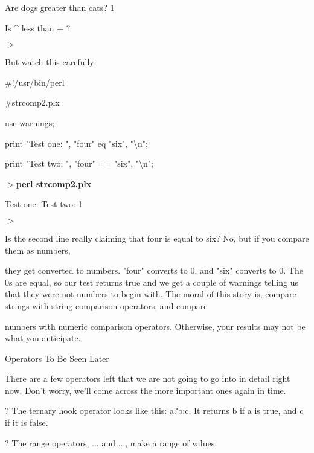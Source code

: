 \documentclass[a4paper,11pt]{book}
\begin{document}
\noindent Are dogs greater than cats? 1

\noindent Is \^{} less than + ?

\noindent $>$

\noindent 

\noindent But watch this carefully:

\noindent 

\noindent 

\noindent \#!/usr/bin/perl

\noindent \#strcomp2.plx

\noindent use warnings;

\noindent print "Test one: ", "four" eq "six", "\textbackslash n";

\noindent print "Test two: ", "four" == "six", "\textbackslash n";

\noindent 

\noindent $>$\textbf{perl strcomp2.plx}

\noindent Test one: Test two: 1

\noindent $>$

\noindent 

\noindent 

\noindent Is the second line really claiming that four is equal to six? No, but if you compare them as numbers,

\noindent they get converted to numbers. "four" converts to 0, and "six" converts to 0. The 0s are equal, so our test returns true and we get a couple of warnings telling us that they were not numbers to begin with. The moral of this story is, compare strings with string comparison operators, and compare

\noindent numbers with numeric comparison operators. Otherwise, your results may not be what you anticipate.

\noindent 

\noindent 

\noindent Operators To Be Seen Later

\noindent 

\noindent There are a few operators left that we are not going to go into in detail right now. Don't worry, we'll come across the more important ones again in time.

\noindent 

\noindent ? The ternary hook operator looks like this: a?b:c. It returns b if a is true, and c if it is false.

\noindent 

\noindent ? The range operators, ... and ..., make a range of values.
\end{document}
